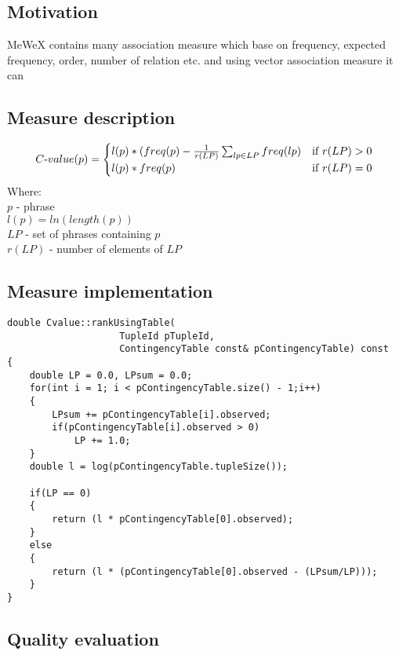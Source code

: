 \subsection{Motivation}
MeWeX contains many association measure which base on frequency, expected frequency, order, number of relation etc. 
and using vector association measure it can 

\subsection{Measure description}
\[ 
    C{\text -}value(p) = \begin{cases}
        l(p) * (freq(p) - \frac{1}{r(LP)}\sum_{lp \in LP}{freq(lp)} & \text{if } r(LP) > 0\\
        l(p) * freq(p)            & \text{if } r(LP) = 0\\
    \end{cases}
\]
Where: \\
\(p\)  - phrase \\
\(l(p) = ln(length(p))\) \\
\(LP\)  - set of phrases containing \(p\) \\
\(r(LP)\) - number of elements of \(LP\) \\

\subsection{Measure implementation}
\begin{lstlisting}
double Cvalue::rankUsingTable(
                    TupleId pTupleId, 
                    ContingencyTable const& pContingencyTable) const
{
    double LP = 0.0, LPsum = 0.0;
    for(int i = 1; i < pContingencyTable.size() - 1;i++)
    {
        LPsum += pContingencyTable[i].observed;
        if(pContingencyTable[i].observed > 0)
            LP += 1.0;
    }
    double l = log(pContingencyTable.tupleSize());

    if(LP == 0)
    {
        return (l * pContingencyTable[0].observed);
    }
    else
    {
        return (l * (pContingencyTable[0].observed - (LPsum/LP)));
    }
}
\end{lstlisting}

\subsection{Quality evaluation}
